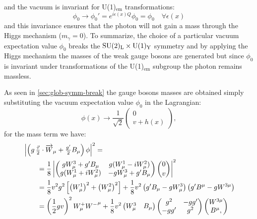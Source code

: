 and the vacuum is invariant for U(1)$_\mathrm{em}$ transformations:
\begin{equation}
  \label{eq:166}
    \phi_0 \rightarrow \phi_0' = e^{i \epsilon(x) Q} \phi_0 = \phi_0 \quad
    \forall \epsilon(x)
\end{equation}
and this invariance ensures that the photon will not gain a mass through the
Higgs mechanism ($m_\gamma = 0$). To summarize, the choice of a particular
vacuum expectation value $\phi_0$ breaks the $\mathrm{SU}(2)_\mathrm{L} \times \mathrm{U}(1)_\mathrm{Y}$ symmetry
and by applying the Higgs mechanism the masses of the weak gauge bosons are
generated but since $\phi_0$ is invariant under transformations of the
U(1)$_\mathrm{em}$ subgroup the photon remains massless.

As seen in \cref{sec:glob-symm-break} the gauge bosons masses are obtained
simply substituting the vacuum expectation value $\phi_{0}$ in the Lagrangian:
\begin{equation}
  \label{eq:167}
  \phi(x) \rightarrow \frac{1}{\sqrt{2}}
  \begin{pmatrix}
    0 \\
    v + h(x)
  \end{pmatrix},
\end{equation}
for the mass term we have:
\begin{equation}
  \label{eq:48}
  \begin{aligned}
     \MoveEqLeft \left| \left( g\,\tfrac{\vec \tau}{2} \cdot \vect{W}_{\mu} +
      \tfrac{g'}{2}
      B_{\mu} \right) \phi \right|^{2} = \\
    &= \frac{1}{8} \left|
      \begin{pmatrix}
        g W^{3}_{\mu} + g' B_{\mu} & g(W^{1}_{\mu} - i W^{2}_{\mu}) \\
        g(W^{1}_{\mu} + iW^{2}_{\mu}) & -g W^{3}_{\mu} + g' B_{\mu}
      \end{pmatrix}
      \binom{0}{v} \right|^{2} \\
    &= \frac{1}{8} v^{2}g^{2} \left[ \left(W^{1}_{\mu} \right)^{2} + \left(W^{2}_{\mu} \right)^{2} \right]
    + \frac{1}{8} v^{2} \left(g' B_{\mu} - g W_{\mu}^{3} \right) \left( g' B^{\mu} - g
    W^{3
      \mu} \right) \\
    &= \left(\frac{1}{2} gv \right)^{2} W^{+}_{\mu} {W^-}^{\mu} + \frac{1}{8} v^{2}
    \begin{pmatrix}
      W_{\mu}^{3} & B_{\mu}
    \end{pmatrix}
    \begin{pmatrix}
      g^{2} & - g g' \\
      - g g' & g^{2}
    \end{pmatrix}
    \begin{pmatrix}
      W^{3 \mu} \\ B^{\mu},
    \end{pmatrix}
  \end{aligned}
\end{equation}

